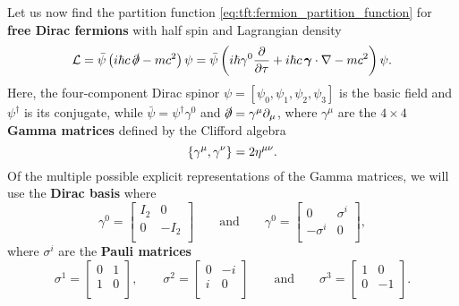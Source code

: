 Let us now find the partition function \eqref{eq:tft:fermion_partition_function} for \textbf{free Dirac fermions} with half spin and Lagrangian density
\begin{equation}
	\mathcal{L} = \bar\psi \left( i \hbar c \, \slashed\partial - m c^2 \right) \psi
	      = \bar\psi \left( i \hbar \gamma^0 \pdv{}{\tau} + i \hbar c \, {\bm{\gamma}} \cdot \nabla - m c^2 \right) \psi .
\label{eq:tft:dirac_lagrangian}
\end{equation}
Here, the four-component Dirac spinor $\psi = [ \psi_0, \psi_1, \psi_2, \psi_3 ] $ is the basic field and $\psi^\dagger$ is its conjugate, while $\bar\psi = \psi^\dagger \gamma^0$ and $\slashed\partial = \gamma^\mu \partial_\mu$, where $\gamma^\mu$ are the $4 \times 4$ \textbf{Gamma matrices} defined by the Clifford algebra
\begin{equation}
	\{ \gamma^\mu , \gamma^\nu \} = 2 \eta^{\mu \nu} .
\end{equation}
Of the multiple possible explicit representations of the Gamma matrices, we will use the \textbf{Dirac basis} where
\begin{equation}
	\gamma^0 = \begin{bmatrix} I_2 & 0 \\ 0 & -I_2 \\ \end{bmatrix}
	\qquad \text{and} \qquad
	\gamma^0 = \begin{bmatrix} 0 & \sigma^i \\ -\sigma^i & 0 \\ \end{bmatrix} ,
\label{eq:tft:gamma_dirac_basis}
\end{equation}
where $\sigma^i$ are the \textbf{Pauli matrices}
\begin{equation}
	\sigma^1 = \begin{bmatrix} 0 & 1 \\ 1 & 0 \\ \end{bmatrix} ,
	\qquad
	\sigma^2 = \begin{bmatrix} 0 & -i \\ i & 0 \\ \end{bmatrix}
	\qquad \text{and} \qquad
	\sigma^3 = \begin{bmatrix} 1 & 0 \\ 0 & -1 \\ \end{bmatrix} .
\label{eq:tft:pauli_matrices}
\end{equation}

